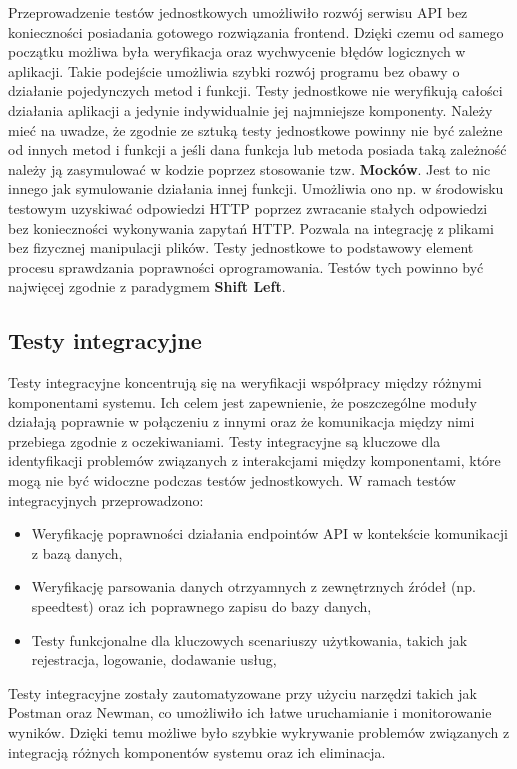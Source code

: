 Przeprowadzenie testów jednostkowych umożliwiło rozwój serwisu API bez konieczności posiadania gotowego rozwiązania frontend. Dzięki czemu od samego początku możliwa była weryfikacja oraz wychwycenie błędów logicznych w aplikacji. Takie podejście umożliwia szybki rozwój programu bez obawy o działanie pojedynczych metod i funkcji. Testy jednostkowe nie weryfikują całości działania aplikacji a jedynie indywidualnie jej najmniejsze komponenty. Należy mieć na uwadze, że zgodnie ze sztuką testy jednostkowe powinny nie być zależne od innych metod i funkcji a jeśli dana funkcja lub metoda posiada taką zależność należy ją zasymulować w kodzie poprzez stosowanie tzw. \textbf{Mocków}. Jest to nic innego jak symulowanie działania innej funkcji. Umożliwia ono np. w środowisku testowym uzyskiwać odpowiedzi HTTP poprzez zwracanie stałych odpowiedzi bez konieczności wykonywania zapytań HTTP. Pozwala na integrację z plikami bez fizycznej manipulacji plików. Testy jednostkowe to podstawowy element procesu sprawdzania poprawności oprogramowania. Testów tych powinno być najwięcej zgodnie z paradygmem \textbf{Shift Left}.


\subsection{Testy integracyjne}
Testy integracyjne koncentrują się na weryfikacji współpracy między różnymi komponentami systemu. Ich celem jest zapewnienie, że poszczególne moduły działają poprawnie w połączeniu z innymi oraz że komunikacja między nimi przebiega zgodnie z oczekiwaniami. Testy integracyjne są kluczowe dla identyfikacji problemów związanych z interakcjami między komponentami, które mogą nie być widoczne podczas testów jednostkowych.
W ramach testów integracyjnych przeprowadzono:
\begin{itemize}
    \item Weryfikację poprawności działania endpointów API w kontekście komunikacji z bazą danych,
    \item Weryfikację parsowania danych otrzyamnych z zewnętrznych źródeł (np. speedtest) oraz ich poprawnego zapisu do bazy danych,
    \item Testy funkcjonalne dla kluczowych scenariuszy użytkowania, takich jak rejestracja, logowanie, dodawanie usług,
\end{itemize}
Testy integracyjne zostały zautomatyzowane przy użyciu narzędzi takich jak Postman oraz Newman, co umożliwiło ich łatwe uruchamianie i monitorowanie wyników. Dzięki temu możliwe było szybkie wykrywanie problemów związanych z integracją różnych komponentów systemu oraz ich eliminacja.
